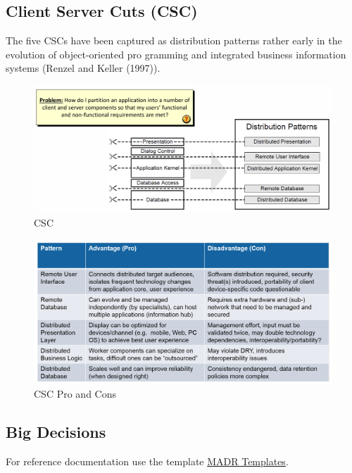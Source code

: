 \documentclass[../Main.tex]{subfiles}
\begin{document}
\subsection{Client Server Cuts (CSC)}
The five CSCs have been captured as distribution patterns 
rather early in the evolution of object-oriented pro gramming
and integrated business information systems (Renzel and Keller (1997)).
\begin{figure}[H]
    \centering
    \includegraphics[width=1\linewidth]{Images/csc.png}
    \caption{CSC}
\end{figure}

\begin{figure}[H]
    \centering
    \includegraphics[width=1\linewidth]{Images/csc-pro-con.png}
    \caption{CSC Pro and Cons}
\end{figure}

\subsection{Big Decisions}
For reference documentation use the template \href{https://github.com/adr/madr}{MADR Templates}.
\end{document}

